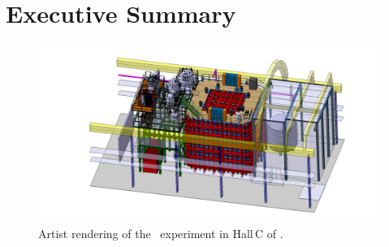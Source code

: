 \section{Executive Summary}
\label{sec:ExecutiveSummary}


\vspace{1cm}

\begin{figure}[t!]
\vspace*{-3cm}\includegraphics[width=1.5\textwidth, angle=280]{./Figures/assembly_sequence_11_07/58.png}
\caption[Artist rendering of the \DSks\ experiment in Hall C of \LNGS]{Artist rendering of the \DSks\ experiment in Hall\,C of \LNGS.}
\label{fig:Overall-Design}
\end{figure}

